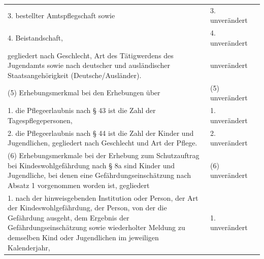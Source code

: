 \documentclass[10pt,a4paper,landscape]{article}
\begin{document}
\begin{longtable}{|L{8.2cm}|L{8.2cm}|L{8.2cm}|}
\hhline{|---|}
3.   \newline bestellter Amtspflegschaft sowie & 3. unverändert &  \\
\hhline{|---|}
4.   \newline Beistandschaft, & 4. unverändert &  \\
\hhline{|---|}
gegliedert nach Geschlecht, Art des  \newline Tätigwerdens des Jugendamts sowie nach  \newline deutscher und ausländischer  \newline Staatsangehörigkeit (Deutsche/Ausländer). & unverändert &  \\
\hhline{|---|}
(5) Erhebungsmerkmal bei den Erhebungen  \newline über & (5) unverändert &  \\
\hhline{|---|}
1.   \newline die Pflegeerlaubnis nach \S{} 43 ist die Zahl  \newline der Tagespflegepersonen, & 1. unverändert &  \\
\hhline{|---|}
2.   \newline die Pflegeerlaubnis nach \S{} 44 ist die Zahl  \newline der Kinder und Jugendlichen, gegliedert  \newline nach Geschlecht und Art der Pflege. & 2. unverändert &  \\
\hhline{|---|}
(6) Erhebungsmerkmale bei der Erhebung  \newline zum Schutzauftrag bei  \newline Kindeswohlgefährdung nach \S{} 8a sind  \newline Kinder und Jugendliche, bei denen eine  \newline Gefährdungseinschätzung nach Absatz 1  \newline vorgenommen worden ist, gegliedert & (6) unverändert &  \\
\hhline{|---|}
1.   \newline nach der hinweisgebenden Institution oder  \newline Person, der Art der Kindeswohlgefährdung,  \newline der Person, von der die Gefährdung  \newline ausgeht, dem Ergebnis der  \newline Gefährdungseinschätzung sowie  \newline wiederholter Meldung zu demselben Kind  \newline oder Jugendlichen im jeweiligen  \newline Kalenderjahr, & 1. unverändert &  \\

\end{longtable}
\end{document}
